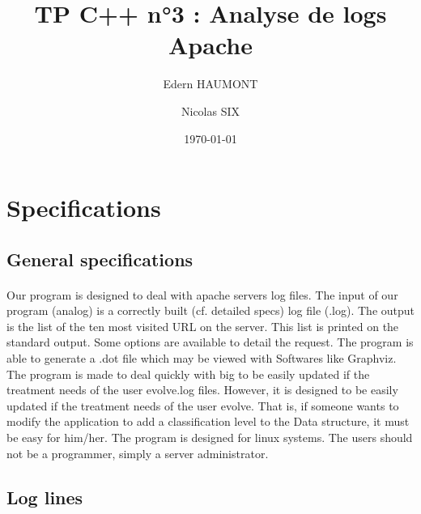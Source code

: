 \documentclass[a4paper, 12pts]{article}
\title{TP C++ n°3 : Analyse de logs Apache}
\author{Edern HAUMONT}
\author{Nicolas SIX}
\affil{B3111}
\date{\today}
\begin{document}

\maketitle



\section{Specifications}
\subsection{General specifications}
\paragraph{}
 Our program is designed to deal with apache servers log files. The input of our program (analog) is a correctly built (cf. detailed specs) log file (.log). The output is the list of the ten most visited URL on the server. This list is printed on the standard output. Some options are available to detail the request. The program is able to generate a .dot file which may be viewed with Softwares like Graphviz.
 The program is made to deal quickly with big to be easily updated if the treatment needs of the user evolve.log files. However, it is designed to be easily updated if the treatment needs of the user evolve. That is, if someone wants to modify the application to add a classification level to the Data structure, it must be easy for him/her.
 The program is designed for linux systems. The users should not be a programmer, simply a server administrator.

\subsection{Log lines}
\end{document}
